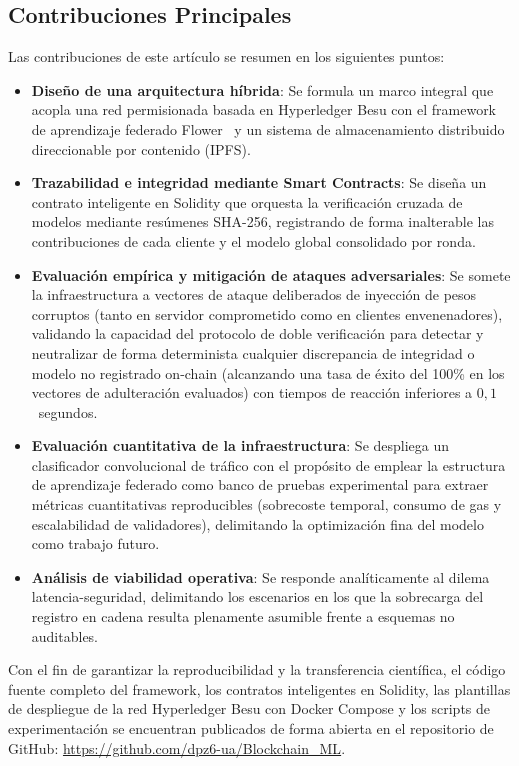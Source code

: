 \subsection{Contribuciones Principales}
Las contribuciones de este artículo se resumen en los siguientes puntos:
\begin{itemize}
    \item \textbf{Diseño de una arquitectura híbrida}: Se formula un marco integral que acopla una red permisionada basada en Hyperledger Besu con el framework de aprendizaje federado Flower~\cite{beutel2020flower} y un sistema de almacenamiento distribuido direccionable por contenido (IPFS).
    \item \textbf{Trazabilidad e integridad mediante Smart Contracts}: Se diseña un contrato inteligente en Solidity que orquesta la verificación cruzada de modelos mediante resúmenes SHA-256, registrando de forma inalterable las contribuciones de cada cliente y el modelo global consolidado por ronda.
    \item \textbf{Evaluación empírica y mitigación de ataques adversariales}: Se somete la infraestructura a vectores de ataque deliberados de inyección de pesos corruptos (tanto en servidor comprometido como en clientes envenenadores), validando la capacidad del protocolo de doble verificación para detectar y neutralizar de forma determinista cualquier discrepancia de integridad o modelo no registrado on-chain (alcanzando una tasa de éxito del 100\% en los vectores de adulteración evaluados) con tiempos de reacción inferiores a $0{,}1$~segundos.
    \item \textbf{Evaluación cuantitativa de la infraestructura}: Se despliega un clasificador convolucional de tráfico con el propósito de emplear la estructura de aprendizaje federado como banco de pruebas experimental para extraer métricas cuantitativas reproducibles (sobrecoste temporal, consumo de gas y escalabilidad de validadores), delimitando la optimización fina del modelo como trabajo futuro.
    \item \textbf{Análisis de viabilidad operativa}: Se responde analíticamente al dilema latencia-seguridad, delimitando los escenarios en los que la sobrecarga del registro en cadena resulta plenamente asumible frente a esquemas no auditables.
\end{itemize}

Con el fin de garantizar la reproducibilidad y la transferencia científica, el código fuente completo del framework, los contratos inteligentes en Solidity, las plantillas de despliegue de la red Hyperledger Besu con Docker Compose y los scripts de experimentación se encuentran publicados de forma abierta en el repositorio de GitHub: \url{https://github.com/dpz6-ua/Blockchain_ML}.

